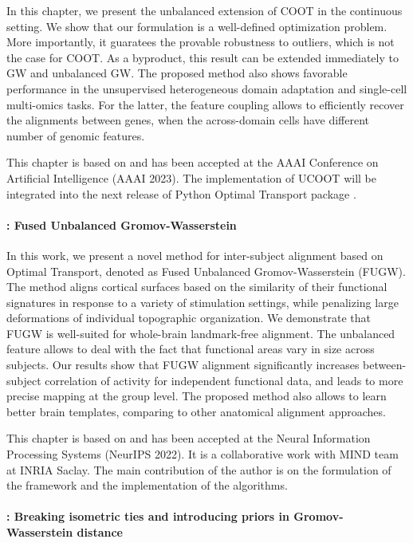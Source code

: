 In this chapter, we present the unbalanced extension of COOT in the
continuous setting. We show that our formulation is a well-defined optimization problem.
More importantly, it guaratees the provable robustness to outliers,
which is not the case for COOT. As a byproduct, this result can be
extended immediately to GW and unbalanced GW. The proposed method also shows favorable performance in
the unsupervised heterogeneous domain adaptation and single-cell multi-omics tasks.
For the latter, the feature coupling allows to efficiently recover
the alignments between genes, when the across-domain cells have different number of genomic features.

This chapter is based on \citep{Tran23} and has been accepted at the
AAAI Conference on Artificial Intelligence (AAAI 2023). The implementation of UCOOT will be
integrated into the next release of Python Optimal Transport package \citep{Flamary21}.

\paragraph{: Fused Unbalanced Gromov-Wasserstein}

In this work, we present a novel method for inter-subject alignment based on Optimal Transport,
denoted as Fused Unbalanced Gromov-Wasserstein (FUGW). The method aligns cortical surfaces based
on the similarity of their functional signatures in response to a variety of stimulation settings,
while penalizing large deformations of individual topographic organization. We demonstrate that
FUGW is well-suited for whole-brain landmark-free alignment. The unbalanced feature allows
to deal with the fact that functional areas vary in size across subjects. Our results show that
FUGW alignment significantly increases between-subject correlation of activity for independent
functional data, and leads to more precise mapping at the group level.
The proposed method also allows to learn better brain templates, comparing to other anatomical
alignment approaches.

This chapter is based on \citep{Thual22} and has been accepted at the
Neural Information Processing Systems (NeurIPS 2022).
It is a collaborative work with MIND team at INRIA Saclay.
The main contribution of the author is on the formulation of the framework
and the implementation of the algorithms.

\paragraph{: Breaking isometric ties and introducing priors in
Gromov-Wasserstein distance}

